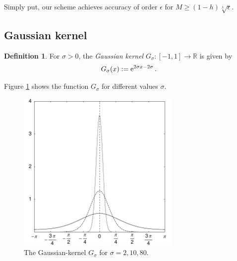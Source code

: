 \documentclass[11pt,a4paper,twoside,bibtotoc]{scrartcl}
\theoremstyle{plain}
\theoremstyle{definition}
\newtheorem{definition}[theorem]{Definition}
\theoremstyle{remark}
\newcommand{\R}{\ensuremath{\mathbb{R}}}
\newcommand{\interv}[4]{\ensuremath{\left#1\left.#2,#3\right#4\right.}}
\newcommand{\fun}[2]{\ensuremath{#1{\hspace{-0.4ex}}\left(#2\right)}}
\newcommand{\e}{\mbox{\rm{e}}}
\numberwithin{equation}{section}
\numberwithin{table}{section}
\numberwithin{figure}{section}
\begin{document}
Simply put, our scheme achieves accuracy of order $\epsilon$ for $M \ge
(1-h)\sqrt[\lambda]{\epsilon}$.

\subsection{Gaussian kernel}
\begin{definition}
  For $\sigma>0$, the \emph{Gaussian kernel}
  $G_{\sigma}:\interv{[}{-1}{1}{]} \rightarrow \R$ is given by
  \begin{equation}
    \label{GaussKernel}
    \nonumber
    \fun{G_{\sigma}}{x} := \e^{2\sigma x-2\sigma}\,.
  \end{equation}
\end{definition}

Figure \ref{Basics:Figure:GKernel} shows the function $G_{\sigma}$ for
different values $\sigma$.
\begin{figure}[tb]
  \centering
  \includegraphics[width=0.7\textwidth]{images/gaussian}
  \caption{The Gaussian-kernel $G_{\sigma}$ for $\sigma = 2,10,80$.}
  \label{Basics:Figure:GKernel}
\end{figure}
\end{document}

